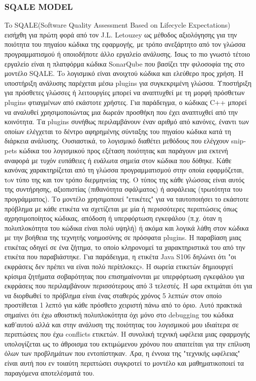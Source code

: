 \documentclass[a4paper, 11pt]{article}
\begin{document}
{{\subsubsection{\textlatin{SQALE MODEL}}

To \textlatin{SQALE(Software Quality Assessment Based on Lifecycle Expectations)}
εισήχθη για πρώτη φορά από τον \textlatin{J.L. Letouzey} ως μέθοδος αξιολόγησης για 
την ποιότητα του πηγαίου κώδικα της εφαρμογής, με τρόπο ανεξάρτητο από τον γλώσσα προγραμματισμού
ή οποιοδήποτε άλλο εργαλείο ανάλυσης. Ίσως το πιο γνωστό τέτοιο εργαλείο είναι η πλατφόρμα κώδικα \textlatin{SonarQube}
που βασίζει την φιλοσοφία της στο μοντέλο \textlatin{SQALE}. To λογισμικό είναι ανοιχτού κώδικα και ελεύθερο προς χρήση.
Η υποστήριξη ανάλυσης παρέχεται μέσω \textlatin{plugins} για συγκεκριμένη γλώσσα.
Υποστήριξη για πρόσθετες γλώσσες ή λειτουργίες
μπορεί να αναπτυχθεί με τη μορφή πρόσθετων \textlatin{plugins} φτιαγμένων από εκάστοτε χρήστες. Για παράδειγμα, ο κώδικας \textlatin{C++} μπορεί να αναλυθεί
χρησιμοποιώντας μια δωρεάν προσθήκη που έχει αναπτυχθεί από την κοινότητα. Τα \textlatin{plugins} συνήθως περιλαμβάνουν έναν αριθμό από
κανόνες, έναντι των οποίων ελέγχεται το δέντρο αφηρημένης σύνταξης του πηγαίου κώδικα κατά τη διάρκεια
ανάλυσης. Ουσιαστικά, το λογισμικό διαθέτει μεθόδους που ελέγχουν \textlatin{snippets} κώδικα του λογισμικού προς εξέταση ποιότητας και παράγουν μια εκτενή αναφορά με τυχόν ευπάθειες ή ευάλωτα σημεία στον κώδικα που δόθηκε. Κάθε κανόνας χαρακτηρίζεται από τη γλώσσα προγραμματισμού στην οποία εφαρμόζεται, τoν τύπο της
και τον τρόπο διερμηνείας της. Ο τύπος της κάθε γλώσσας είναι αυτός της συντήρησης, αξιοπιστίας (πιθανότητα σφάλματος) ή ασφάλειας (τρωτότητα του προγράμματος). Το μοντέλο χρησιμοποιεί "ετικέτες" για να ταυτοποιήσει το εκάστοτε πρόβλημα
με κάθε ετικέτα να σχετίζεται με μία ή περισσότερες περιπτώσεις όπως
 αχρησιμοποίητος κώδικας, απόδοση ή υπερφόρτωση εγκεφάλου (π.χ. όταν η πολυπλοκότητα του κώδικα είναι πολύ υψηλή) ή ακόμα και λογικά λάθη στον κώδικα με την βοήθεια της τεχνητής νοημοσύνης σε πρόσφατα \textlatin{plugins}.
Η παραβίαση μιας ετικέτας οδηγεί σε ένα ζήτημα, το οποίο κληρονομεί τα χαρακτηριστικά του από την
ετικέτα που παραβιάστηκε. Για παράδειγμα, η ετικέτα \textlatin{Java S106} δηλώνει ότι "οι εκφράσεις
δεν πρέπει να είναι πολύ περίπλοκες». Η σωρεία ετικετών δημιουργεί κρίσιμα ζητήματα σοβαρότητας που επισημαίνονται
με υπερφόρτωση εγκεφάλου για εκφράσεις που περιλαμβάνουν περισσότερους από 3 τελεστές. Η ωρα
εκτιμάται ότι για να διορθωθεί το πρόβλημα είναι ένας σταθερός χρόνος 5 λεπτών στον οποίο προστίθεται 1 λεπτό
για κάθε πρόσθετο χειριστή πάνω από το όριο. Αυτό πρακτικά σημαίνει ότι έχω αθοιστική πολυπλοκότητα όχι μόνο στο debugging του 
κώδικα καθ'αυτού αλλά και στην ανάλυση της ποιότητας του λογισμικού μου ιδιαίτερα σε περιπτώσεις που έχω \textlatin{conflicts} ετικετών.
H συνολική τεχνική ωφέλεια μιας εφαρμογής υπολογίζεται ως το άθροισμα του εκτιμώμενου
χρόνου που απαιτείται για την επίλυση όλων των προβλημάτων που εντοπίστηκαν. Άρα, η έννοια της "τεχνικής ωφέλειας" είναι αυτή που εν τοιαύτη περιπτώσει συγκροτεί το μοντέλο και μαθηματικοποιεί τα παραγόμενα αποτελέσματά του.

}}
\end{document}
